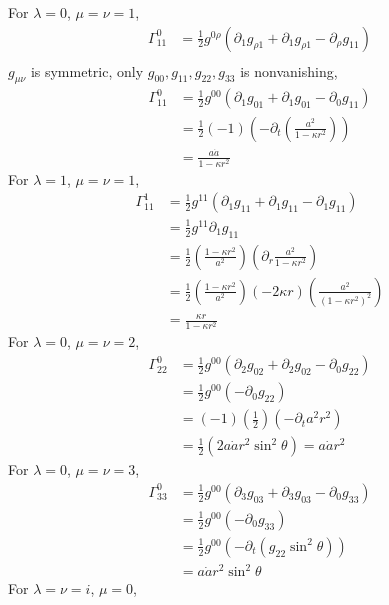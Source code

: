 \begin{enumerate}[label=(\alph*)]
	For $\lambda=0$, $\mu=\nu=1$,
		\begin{align*}
		\Gamma^0_{11}  & = \frac{1}{2} g^{0\rho} ( \partial_1 g_{\rho1} + \partial_1 g_{\rho1} - \partial_\rho g_{11} ) 	\\
		\end{align*}
	$g_{\mu\nu}$ is symmetric, only $g_{00},g_{11},g_{22},g_{33}$ is nonvanishing,\\
		\begin{align*}
		\Gamma^0_{11}  & = \frac{1}{2} g^{00} ( \partial_1 g_{01} + \partial_1 g_{01} - \partial_0 g_{11} )\\
	& =  	\frac{1}{2} (-1) (- \partial_t (\frac{a^2}{1-\kappa r^2})) \\
	& = \frac{a \dot{a}}{1-\kappa r^2}
		\end{align*}
	For $\lambda=1$, $\mu=\nu=1$,
		\begin{align*}
		\Gamma^1_{11}  	& = \frac{1}{2} g^{11} ( \partial_1 g_{11} + \partial_1 g_{11} - \partial_1 g_{11} ) 	\\
						& = \frac{1}{2} g^{11} \partial_1 g_{11} \\
 						& = \frac{1}{2} ( \frac{1-\kappa r^2}{a^2} )(\partial_r  \frac{a^2}{1-\kappa r^2}) \\
 						& = \frac{1}{2} ( \frac{1-\kappa r^2}{a^2} )(-2\kappa r)(\frac{a^2}{(1-\kappa r^2)^2})\\
 						& = \frac{\kappa r}{1-\kappa r^2}
		\end{align*}
	For $\lambda=0$, $\mu=\nu=2$,
		\begin{align*}
		\Gamma^0_{22}  	& = \frac{1}{2} g^{00} ( \partial_2 g_{02} + \partial_2 g_{02} - \partial_0 g_{22} ) 	\\
						& = \frac{1}{2} g^{00}(- \partial_0 g_{22}) \\
						& = (-1)(\frac{1}{2})(-\partial_t a^2 r^2) \\
						& = \frac{1}{2}(2a \dot{a} r^2 \sin^2{\theta}) = a \dot{a}r^2
		\end{align*}
	For $\lambda=0$, $\mu=\nu=3$,
		\begin{align*}
		\Gamma^0_{33}  	& = \frac{1}{2} g^{00} ( \partial_3 g_{03} + \partial_3 g_{03} - \partial_0 g_{33} ) 	\\
						& = \frac{1}{2} g^{00}(- \partial_0 g_{33}) \\
						& = \frac{1}{2} g^{00}(- \partial_t (g_{22}\sin^2{\theta})) \\
						& =a \dot{a}r^2 \sin^2{\theta}
		\end{align*}		
	For $\lambda=\nu=i$, $\mu=0$,

\end{enumerate}
